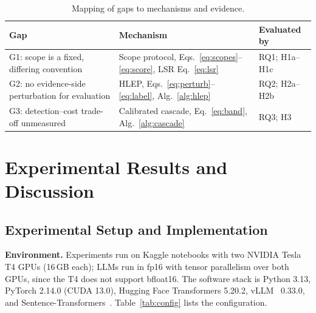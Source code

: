 \documentclass[conference]{IEEEtran}
\begin{document}
\begin{table}[t]
\caption{Mapping of gaps to mechanisms and evidence.}\label{tab:novelty}
\centering\footnotesize
\begin{tabular}{@{}p{}p{}p{}@{}}
\toprule
Gap & Mechanism & Evaluated by \\
\midrule
G1: scope is a fixed, differing convention & Scope protocol, Eqs.~\eqref{eq:scopes}--\eqref{eq:score}, LSR Eq.~\eqref{eq:lsr} & RQ1; H1a--H1c \\
G2: no evidence-side perturbation for evaluation & HLEP, Eqs.~\eqref{eq:perturb}--\eqref{eq:label}, Alg.~\ref{alg:hlep} & RQ2; H2a--H2b \\
G3: detection--cost trade-off unmeasured & Calibrated cascade, Eq.~\eqref{eq:band}, Alg.~\ref{alg:cascade} & RQ3; H3 \\
\bottomrule
\end{tabular}
\end{table}

\section{Experimental Results and Discussion}\label{sec:results}
\subsection{Experimental Setup and Implementation}
\textbf{Environment.} Experiments run on Kaggle notebooks with two NVIDIA Tesla T4 GPUs (16\,GB each); LLMs run in fp16 with tensor parallelism over both GPUs, since the T4 does not support bfloat16. The software stack is Python 3.13, PyTorch 2.14.0 (CUDA 13.0), Hugging Face Transformers 5.20.2, vLLM~\cite{kwon2023vllm} 0.33.0, and Sentence-Transformers~\cite{reimers2019sbert}. Table~\ref{tab:config} lists the configuration.
\end{document}
